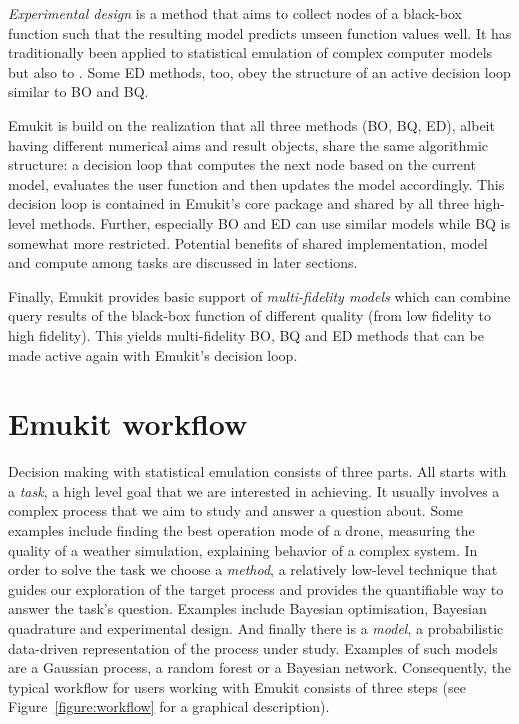 \emph{Experimental design} \cite{Kennedy2000, Kennedy2001, Conti2009, Conti2010} is a method that aims to collect nodes of a black-box function such that the resulting model predicts unseen function values well. It has traditionally been applied to statistical emulation of complex computer models  but also to . Some ED methods, too, obey the structure of an active decision loop similar to BO and BQ.

Emukit is build on the realization that all three methods (BO, BQ, ED), albeit having different numerical aims and result objects, share the same algorithmic structure: a decision loop that computes the next node based on the current model, evaluates the user function and then updates the model accordingly. This decision loop is contained in Emukit's core package and shared by all three high-level methods.
Further, especially BO and ED can use similar models while BQ is somewhat more restricted. Potential benefits of shared implementation, model and compute among tasks are discussed in later sections.

Finally, Emukit provides basic support of \emph{multi-fidelity models} \cite{Peherstorfer2017} which can combine query results of the black-box function of different quality (from low fidelity to high fidelity). This yields multi-fidelity BO, BQ and ED methods that can be made active again with Emukit's decision loop.


\section{Emukit workflow}\label{sec:workflow}
Decision making with statistical emulation consists of three parts. All starts with a \textit{task}, a high level goal that we are interested in achieving. It usually involves a complex process that we aim to study and answer a question about. Some examples include finding the best operation mode of a drone, measuring the quality of a weather simulation, explaining behavior of a complex system. In order to solve the task we choose a \textit{method}, a relatively low-level technique that guides our exploration of the target process and provides the quantifiable way to answer the task's question. Examples include Bayesian optimisation, Bayesian quadrature and experimental design. And finally there is a \textit{model}, a probabilistic data-driven representation of the process under study. Examples of such models are a Gaussian process, a random forest or a Bayesian network. Consequently, the typical workflow for users working with Emukit consists of three steps (see Figure~\ref{figure:workflow} for a graphical description).

